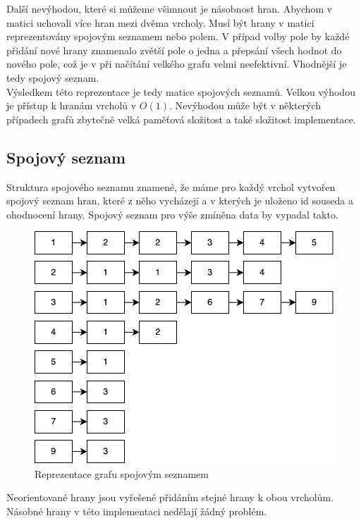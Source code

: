 Další nevýhodou, které si můžeme všimnout je násobnost hran. Abychom v matici uchovali více hran mezi dvěma vrcholy. Musí být hrany v matici reprezentovány spojovým seznamem nebo polem. V případ volby pole by každé přidání nové hrany znamenalo zvětší pole o jedna a přepsání všech hodnot do nového pole, což je v při načítání velkého grafu velmi neefektivní. Vhodnější je tedy spojový seznam.\\

Výsledkem této reprezentace je tedy matice spojových seznamů. Velkou výhodou je přístup k hranám vrcholů v $O(1)$. Nevýhodou může být v některých případech grafů zbytečně velká paměťová složitost a také složitost implementace.


\subsection{Spojový seznam}
Struktura spojového seznamu znamené, že máme pro každý vrchol vytvořen spojový seznam hran, které z něho vycházejí a v kterých je uloženo id souseda a ohodnocení hrany. Spojový seznam pro výše zmíněna data by vypadal takto.\\

\begin{figure}[!h]
	\centering
	 \includegraphics[scale=0.75]{spojak.pdf}
	\caption{Reprezentace grafu spojovým seznamem}
\end{figure}

Neorientované hrany jsou vyřešené přidáním stejné hrany k obou vrcholům. Násobné hrany v této implementaci nedělají žádný problém.\\

